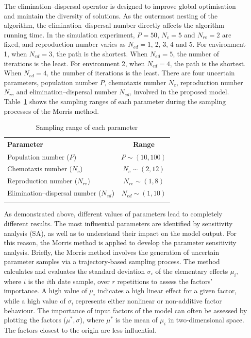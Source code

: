 \documentclass{PDS}%
\theoremstyle{definition}
\begin{document}
The elimination--dispersal operator is designed to improve global optimisation and
maintain the diversity of solutions. As the outermost nesting of the algorithm, the
elimination--dispersal number directly affects the algorithm running time. In the
simulation experiment, $P=50$, $N_c=5$ and $N_{re}=2$ are fixed, and reproduction number varies as $N_{ed}=1$,
2, 3, 4 and 5. For environment 1, when
$N_{ed}=3$, the path is the shortest. When $N_{ed}=5$, the number of iterations is the
least. For environment 2, when $N_{ed}=4$, the path is the shortest. When $N_{ed}=4$, the
number of iterations is the least.
There are four uncertain parameters, population number $P$, chemotaxis number $N_c$,
reproduction number $N_{re}$ and elimination--dispersal number $N_{ed}$, involved
in the proposed model. Table~\ref{table:morrisSamples} shows the sampling ranges of each
parameter during the sampling processes of the Morris method.
\begin{table}[!h]
\centering
\caption{Sampling range of each parameter\label{table:morrisSamples}}
\begin{tabular*}{20pc}{@{\extracolsep\fill}lc@{\extracolsep\fill}}
\toprule
 Parameter & Range \\
\midrule
 Population number ($P$) & $P\sim(10,100)$ \\
 Chemotaxis number ($N_c$) & $N_c\sim(2,12)$ \\
 Reproduction number ($N_{re}$) & $N_{re}\sim(1,8)$ \\
 Elimination--dispersal number ($N_{ed}$) & $N_{ed}\sim(1,10)$ \\
\botrule
\end{tabular*}
\end{table}
As demonstrated above, different values of parameters lead to completely different
results. The most influential parameters are identified by sensitivity analysis (SA), as
well as to understand their impact on the model output. For this reason, the Morris
method \citep{cadero2018global} is applied to develop the parameter sensitivity analysis.
Briefly, the Morris method involves the generation of uncertain parameter samples via a
trajectory-based sampling process. The method calculates and evaluates the standard
deviation $\sigma_i$ of the elementary effects $\mu_i$, where $i$ is the $i${th} date
sample, over $r$ repetitions to assess the factors' importance. A high value of $\mu_i$
indicates a high linear effect for a given factor, while a high value of $\sigma_i$
represents either nonlinear or non-additive factor behaviour. The importance of input
factors of the model can often be assessed by plotting the factors ($\mu^{*},\sigma$),
where $\mu^*$ is the mean of $\mu_i$ in  two-dimensional space. The factors closest to
the origin are less influential.
\end{document}
